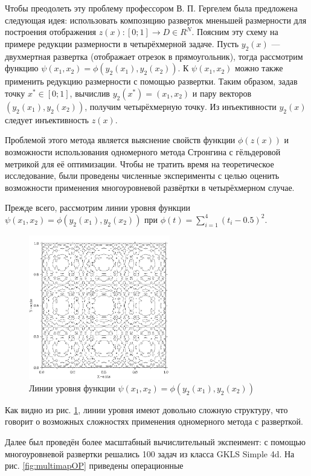 \par
Чтобы преодолеть эту проблему профессором В. П. Гергелем была предложена следующая идея: использовать композицию разверток мненьшей размерности для построения отображения
\(z(x): [0;1] \rightarrow D \in R^N\).
Поясним эту схему на примере редукции размерности в четырёхмерной задаче. Пусть \(y_2(x)\) --- двухмертная развертка (отображает отрезок в прямоугольник), тогда рассмотрим функцию
\(\psi(x_1,x_2)=\phi(y_2(x_1), y_2(x_2))\). К \(\psi(x_1,x_2)\) можно также применить редукцию размерности с помощью развертки. Таким образом, задав точку \(x^*\in [0;1]\),
вычислив \(y_2(x^*)=(x_1,x_2)\) и пару векторов \((y_2(x_1), y_2(x_2))\), получим четырёхмерную точку. Из инъективности \(y_2(x)\) следует инъективность \(z(x)\).
\par
Проблемой этого метода является выяснение свойств функции \(\phi(z(x))\) и возможности использования одномерного метода Стронгина с гёльдеровой метрикой для её оптимизации.
Чтобы не тратить время на теоретическое исследование, были проведены численные эксперименты с целью оценить возможности применения многоуровневой развёртки в четырёхмерном случае.
\par
Прежде всего, рассмотрим линии уровня функции \(\psi(x_1,x_2)=\phi(y_2(x_1), y_2(x_2))\) при \(\phi(t)=\sum_{i=1}^{4}(t_i-0.5)^2\).
\begin{figure}[h]
	\center
  \includegraphics[width=0.55\textwidth]{multimap_isolines.png}
  \caption{Линии уровня функции \(\psi(x_1,x_2)=\phi(y_2(x_1), y_2(x_2))\)}
  \label{fig:1}
\end{figure}
Как видно из рис. \ref{fig:1}, линии уровня имеют довольно сложную структуру, что говорит о возможных сложностях применения одномерного метода с разверткой.
\par
Далее был проведён более масштабный вычислительный экспеимент: с помощью многоуровневой развертки решались 100 задач из класса GKLS Simple 4d. На рис. \ref{fig:multimapOP} приведены операционные
